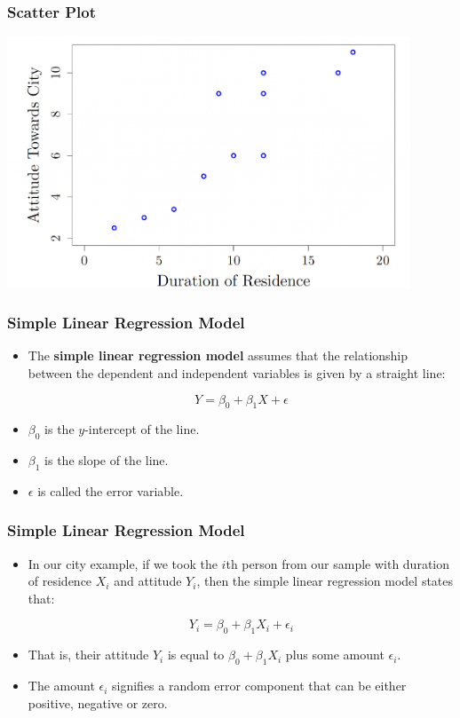 \documentclass[12pt]{beamer}
\begin{document}
\begin{frame}
	\frametitle{Scatter Plot}
	\centering
	\includegraphics[width=12cm]{scatter.png}
	
\end{frame}
\begin{frame}
	\frametitle{\color{blue}Simple Linear Regression Model}
	
	
	\begin{itemize}[label={\color{blue}$\blacktriangleright$}]
		\item The \textbf{simple linear regression model} assumes that the relationship between the dependent and independent variables is given by a straight line:
		
		\[Y = \beta_0 + \beta_1X + \epsilon\]
		
		\item $\beta_0$ is the $y$-intercept of the line.
		
		\item $\beta_1$ is the slope of the line.
		
		\item $\epsilon$ is called the error variable.
	\end{itemize}
	
\end{frame}
\begin{frame}
	\frametitle{\color{blue}Simple Linear Regression Model}
	
	
	\begin{itemize}[label={\color{blue}$\blacktriangleright$}]
		\item In our city example, if we took the $i$th person from our sample with duration of residence $X_i$ and attitude $Y_i$, then the simple linear regression model states that:
		
		\[Y_i = \beta_0 + \beta_1X_i + \epsilon_i\]
		
		\item That is, their attitude $Y_i$ is equal to $\beta_0 + \beta_1X_i$ plus some amount $\epsilon_i$.
		
		\item The amount $\epsilon_i$ signifies a random error component that can be either positive, negative or zero.
	\end{itemize}

\end{frame}
\end{document}
